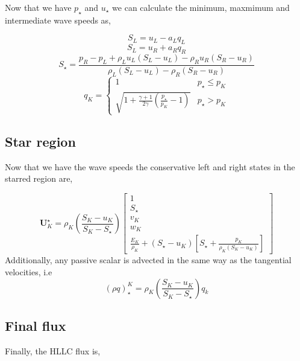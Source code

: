\documentclass{article}
\begin{document}
Now that we have $p_\star$ and $u_\star$ we can calculate the minimum, maxmimum and intermediate wave speeds as,

\begin{equation}
S_L = u_L - a_L q_L
\end{equation}
\begin{equation}
S_L = u_R + a_R q_R
\end{equation}
\begin{equation}
S_\star = \frac{ p_R - p_L + \rho_L u_L (S_L - u_L) - \rho_R u_R (S_R - u_R)}{\rho_L (S_L - u_L) - \rho_R (S_R - u_R)}
\end{equation}
\begin{equation}
q_K = 
\begin{cases}
1 & p_\star \le p_K \\
\sqrt{ 1 + \frac{\gamma +1}{2 \gamma}\left( \frac{p_\star}{p_K} - 1 \right)} & p_\star > p_K
\end{cases}
\end{equation}

\subsection{Star region}
Now that we have the wave speeds the conservative left and right states in the starred region are,

\begin{equation}
\mathbf{U}_K^\star = \rho_K \left( \frac{ S_K - u_K}{S_K - S_\star} \right) \left[
\begin{matrix}
1 \\ 
S_\star \\
v_K \\
w_K \\
\frac{E_K}{\rho_K} + (S_\star - u_K) \left[ S_\star  + \frac{p_K}{\rho_K(S_K-u_K)} \right]
\end{matrix}
\right]
\end{equation}
Additionally, any passive scalar is advected in the same way as the tangential velocities, i.e
\begin{equation}
(\rho q)_\star^K = \rho_K \left( \frac{S_K - u_K}{S_K - S_\star} \right) q_k
\end{equation}


\subsection{Final flux}

Finally, the HLLC flux is,
\end{document}

